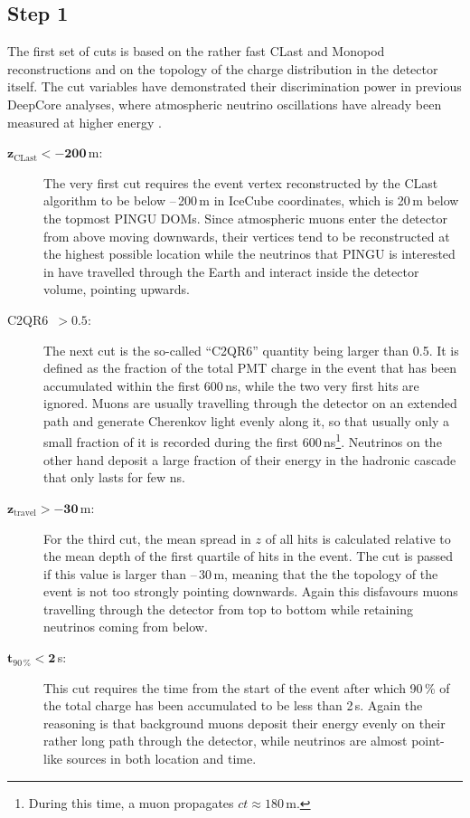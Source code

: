 \subsection{Step 1}
\label{sec:cuts_step1}

The first set of cuts is based on the rather fast CLast and Monopod
reconstructions and on the topology of the charge distribution in the detector
itself. The cut variables have demonstrated their discrimination power in
previous DeepCore analyses, where atmospheric neutrino oscillations have already
been measured at higher energy \cite{DCosc}.

\begin{description}
 \item[$\mathbf{z_\mathrm{CLast} < -200}$\,m:] The very first cut requires the
  event vertex reconstructed by the CLast algorithm to be below --\,200\,m in
  IceCube coordinates, which is 20\,m below the topmost PINGU DOMs. Since
  atmospheric muons enter the detector from above moving downwards, their
  vertices tend to be reconstructed  at the highest possible location while the
  neutrinos that PINGU is interested  in have travelled through the Earth and
  interact inside the detector volume,  pointing upwards.

\item[C2QR6\ $\mathbf{>0.5}$:] The next cut is the so-called ``C2QR6'' quantity
  being  larger than 0.5. It is defined as the fraction of the total PMT charge
  in the  event that has been accumulated within the first 600\,ns, while the
  two very  first hits are ignored. Muons are usually travelling through the
  detector on  an extended path and generate Cherenkov light evenly along it, so
  that usually  only a small fraction of it is recorded during the first
  600\,ns\footnote{During this time, a muon propagates $ct\approx180$\,m.}.
  Neutrinos on the other hand deposit a large fraction of their energy in the
  hadronic cascade that only lasts for few ns.

\item[$\mathbf{z_\mathrm{travel} > -30}$\,m:] For the third cut, the mean spread
  in $z$  of all hits is calculated relative to the mean depth of the first
  quartile of  hits in the event. The cut is passed if this value is larger than
  --\,30\,m,  meaning that the the topology of the event is not too strongly
  pointing  downwards. Again this disfavours muons travelling through the
  detector from  top to bottom while retaining neutrinos coming from below.

\item[$\mathbf{t_\mathrm{90\,\%} < 2}$\,\textmu s:] This cut requires the
  time from  the start of the event after which 90\,\% of the total charge has
  been  accumulated to be less than 2\,\textmu s. Again the reasoning is that
  background muons deposit their energy evenly on their rather long path
  through the  detector, while neutrinos are almost point-like sources in both
  location and  time.


\end{description}
